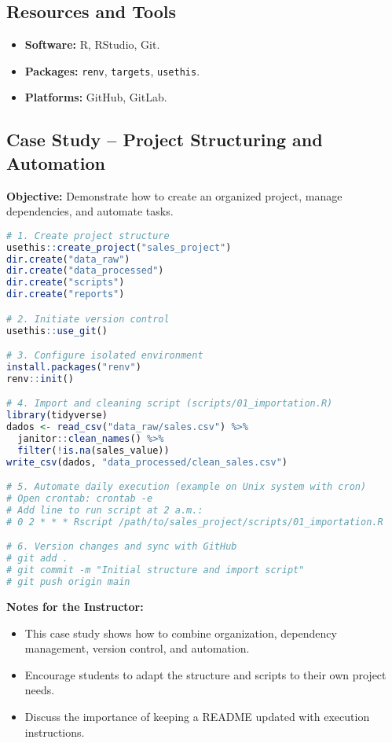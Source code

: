 \subsection{\textcolor{subsectionblue}{Resources and Tools}}
\begin{itemize}
  \item \textbf{Software:} R, RStudio, Git.
  \item \textbf{Packages:} \texttt{renv}, \texttt{targets}, \texttt{usethis}.
  \item \textbf{Platforms:} GitHub, GitLab.
\end{itemize}

\subsection{\textcolor{subsectionblue}{Case Study – Project Structuring and Automation}}
\textbf{Objective:} Demonstrate how to create an organized project, manage dependencies, and automate tasks.

\begin{lstlisting}[language=R]
# 1. Create project structure
usethis::create_project("sales_project")
dir.create("data_raw")
dir.create("data_processed")
dir.create("scripts")
dir.create("reports")

# 2. Initiate version control
usethis::use_git()

# 3. Configure isolated environment
install.packages("renv")
renv::init()

# 4. Import and cleaning script (scripts/01_importation.R)
library(tidyverse)
dados <- read_csv("data_raw/sales.csv") %>%
  janitor::clean_names() %>%
  filter(!is.na(sales_value))
write_csv(dados, "data_processed/clean_sales.csv")

# 5. Automate daily execution (example on Unix system with cron)
# Open crontab: crontab -e
# Add line to run script at 2 a.m.:
# 0 2 * * * Rscript /path/to/sales_project/scripts/01_importation.R

# 6. Version changes and sync with GitHub
# git add .
# git commit -m "Initial structure and import script"
# git push origin main
\end{lstlisting}

\textbf{Notes for the Instructor:}
\begin{itemize}
  \item This case study shows how to combine organization, dependency management, version control, and automation.
  \item Encourage students to adapt the structure and scripts to their own project needs.
  \item Discuss the importance of keeping a README updated with execution instructions.
\end{itemize}